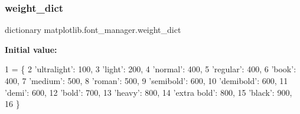 \subsubsection{\texorpdfstring{weight\+\_\+dict}{weight\_dict}}
{\footnotesize\ttfamily dictionary matplotlib.\+font\+\_\+manager.\+weight\+\_\+dict}

{\bfseries Initial value\+:}
\begin{DoxyCode}
1 =  \{
2     \textcolor{stringliteral}{'ultralight'}: 100,
3     \textcolor{stringliteral}{'light'}:      200,
4     \textcolor{stringliteral}{'normal'}:     400,
5     \textcolor{stringliteral}{'regular'}:    400,
6     \textcolor{stringliteral}{'book'}:       400,
7     \textcolor{stringliteral}{'medium'}:     500,
8     \textcolor{stringliteral}{'roman'}:      500,
9     \textcolor{stringliteral}{'semibold'}:   600,
10     \textcolor{stringliteral}{'demibold'}:   600,
11     \textcolor{stringliteral}{'demi'}:       600,
12     \textcolor{stringliteral}{'bold'}:       700,
13     \textcolor{stringliteral}{'heavy'}:      800,
14     \textcolor{stringliteral}{'extra bold'}: 800,
15     \textcolor{stringliteral}{'black'}:      900,
16 \}
\end{DoxyCode}
